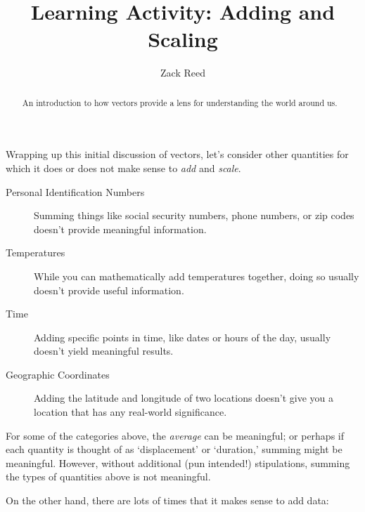 \documentclass{ximera}
\author{Zack Reed}
\title{Learning Activity: Adding and Scaling}
\begin{document}
\begin{abstract}
    An introduction to how vectors provide a lens for understanding the world around us.
\end{abstract}
\maketitle

\begin{exploration}

  Wrapping up this initial discussion of vectors, let's consider other quantities for which it does or does not make sense to \emph{add} and \emph{scale}.

  \begin{example}

\begin{description}
\item[Personal Identification Numbers] Summing things like social
  security numbers, phone numbers, or zip codes doesn't provide
  meaningful information.
\item[Temperatures] While you can mathematically add temperatures
  together, doing so usually doesn't provide useful information.
\item[Time] Adding specific points in time, like dates or hours of the
  day, usually doesn't yield meaningful results.
\item[Geographic Coordinates] Adding the latitude and longitude of two
  locations doesn't give you a location that has any real-world
  significance.
\end{description}
\end{example}

For some of the categories above, the \textit{average} can be
meaningful; or perhaps if each quantity is thought of as
`displacement' or `duration,' summing might be meaningful. However,
without additional (pun intended!) stipulations, summing the types of
quantities above is not meaningful.

\begin{example}

On the other hand, there are lots of
times that it makes sense to add data:



\end{example}
\end{exploration}
\end{document}

